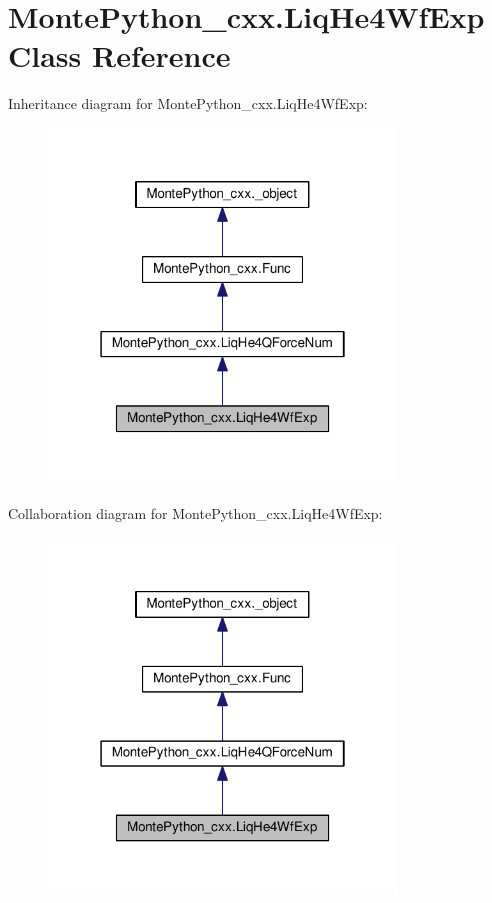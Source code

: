 \hypertarget{classMontePython__cxx_1_1LiqHe4WfExp}{}\section{Monte\+Python\+\_\+cxx.\+Liq\+He4\+Wf\+Exp Class Reference}
\label{classMontePython__cxx_1_1LiqHe4WfExp}


Inheritance diagram for Monte\+Python\+\_\+cxx.\+Liq\+He4\+Wf\+Exp\+:
\nopagebreak
\begin{figure}[H]
\begin{center}
\leavevmode
\includegraphics[width=262pt]{classMontePython__cxx_1_1LiqHe4WfExp__inherit__graph}
\end{center}
\end{figure}


Collaboration diagram for Monte\+Python\+\_\+cxx.\+Liq\+He4\+Wf\+Exp\+:
\nopagebreak
\begin{figure}[H]
\begin{center}
\leavevmode
\includegraphics[width=262pt]{classMontePython__cxx_1_1LiqHe4WfExp__coll__graph}
\end{center}
\end{figure}
